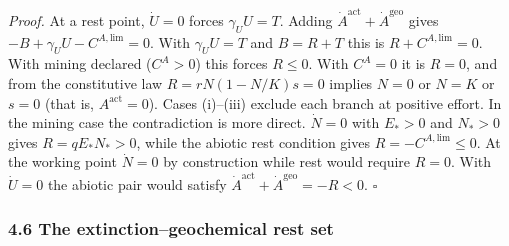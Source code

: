 \documentclass[11pt]{article}
\begin{document}
\emph{Proof.} At a rest point, \(\dot U = 0\) forces \(\gamma_U U = T\). Adding \(\dot A^{\mathrm{act}} + \dot A^{\mathrm{geo}}\) gives \(-B + \gamma_U U - C^{A,\mathrm{lim}} = 0\). With \(\gamma_U U = T\) and \(B = R + T\) this is \(R + C^{A,\mathrm{lim}} = 0\). With mining declared (\(C^A > 0\)) this forces \(R \le 0\). With \(C^A = 0\) it is \(R = 0\), and from the constitutive law \(R = rN(1 - N/\allowbreak{}K)s = 0\) implies \(N = 0\) or \(N = K\) or \(s = 0\) (that is, \(A^{\mathrm{act}} = 0\)). Cases (i)--(iii) exclude each branch at positive effort. In the mining case the contradiction is more direct. \(\dot N = 0\) with \(E_* > 0\) and \(N_* > 0\) gives \(R = qE_*N_* > 0\), while the abiotic rest condition gives \(R = -C^{A,\mathrm{lim}} \le 0\). At the working point \(\dot N = 0\) by construction while rest would require \(R = 0\). With \(\dot U = 0\) the abiotic pair would satisfy \(\dot A^{\mathrm{act}} + \dot A^{\mathrm{geo}} = -R < 0\). \ensuremath{\square}

\subsubsection{4.6 The extinction--geochemical rest
set}\label{the-extinctiongeochemical-rest-set}
\end{document}
